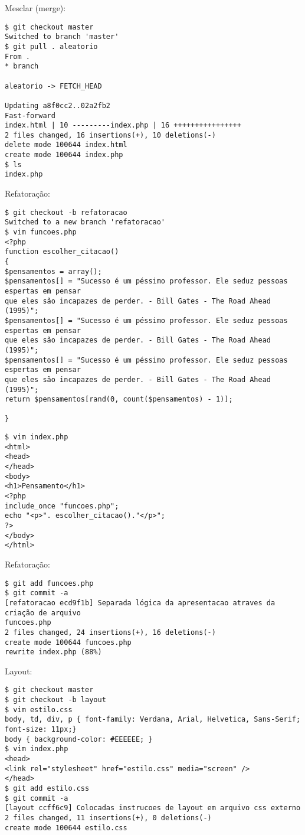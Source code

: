 \documentclass{beamer}
\begin{document}
Mesclar (merge):
\begin{verbatim}
$ git checkout master
Switched to branch 'master'
$ git pull . aleatorio
From .
* branch

aleatorio -> FETCH_HEAD

Updating a8f0cc2..02a2fb2
Fast-forward
index.html | 10 ---------index.php | 16 ++++++++++++++++
2 files changed, 16 insertions(+), 10 deletions(-)
delete mode 100644 index.html
create mode 100644 index.php
$ ls
index.php
\end{verbatim}

Refatoração:
\begin{verbatim}
$ git checkout -b refatoracao
Switched to a new branch 'refatoracao'
$ vim funcoes.php
<?php
function escolher_citacao()
{
$pensamentos = array();
$pensamentos[] = "Sucesso é um péssimo professor. Ele seduz pessoas espertas em pensar
que eles são incapazes de perder. - Bill Gates - The Road Ahead (1995)";
$pensamentos[] = "Sucesso é um péssimo professor. Ele seduz pessoas espertas em pensar
que eles são incapazes de perder. - Bill Gates - The Road Ahead (1995)";
$pensamentos[] = "Sucesso é um péssimo professor. Ele seduz pessoas espertas em pensar
que eles são incapazes de perder. - Bill Gates - The Road Ahead (1995)";
return $pensamentos[rand(0, count($pensamentos) - 1)];

}
\end{verbatim}

\begin{verbatim}
$ vim index.php
<html>
<head>
</head>
<body>
<h1>Pensamento</h1>
<?php
include_once "funcoes.php";
echo "<p>". escolher_citacao()."</p>";
?>
</body>
</html>
\end{verbatim}

Refatoração:
\begin{verbatim}
$ git add funcoes.php
$ git commit -a
[refatoracao ecd9f1b] Separada lógica da apresentacao atraves da criação de arquivo
funcoes.php
2 files changed, 24 insertions(+), 16 deletions(-)
create mode 100644 funcoes.php
rewrite index.php (88%)
\end{verbatim}

Layout:
\begin{verbatim}
$ git checkout master
$ git checkout -b layout
$ vim estilo.css
body, td, div, p { font-family: Verdana, Arial, Helvetica, Sans-Serif; font-size: 11px;}
body { background-color: #EEEEEE; }
$ vim index.php
<head>
<link rel="stylesheet" href="estilo.css" media="screen" />
</head>
$ git add estilo.css
$ git commit -a
[layout ccff6c9] Colocadas instrucoes de layout em arquivo css externo
2 files changed, 11 insertions(+), 0 deletions(-)
create mode 100644 estilo.css
\end{verbatim}
\end{document}

